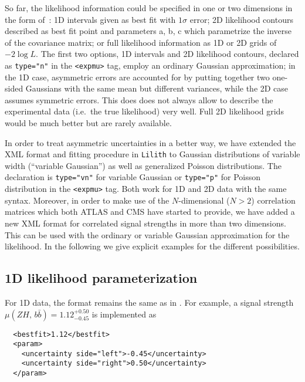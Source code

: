 So far, the likelihood information could be specified in one or two dimensions %
in the form of~\cite{Bernon:2015hsa}:  
1D intervals given as best fit with $1\sigma$ error; 
2D likelihood contours described as best fit point and parameters a, b, c which parametrize the inverse of the covariance matrix; 
or full likelihood information as 1D or 2D grids of $-2\log L$. 
The first two options, 1D intervals and 2D likelihood contours, 
declared as {\tt type="n"} in the  {\tt <expmu>} tag, employ an ordinary Gaussian approximation; 
in the 1D case, asymmetric errors are accounted for by putting together two one-sided Gaussians with the same mean but different variances, 
while the 2D case assumes symmetric errors.   
This does does not always allow to describe the experimental data (i.e.\ the true likelihood) very well. 
Full 2D likelihood grids would be much better but are rarely available. %

In order to treat asymmetric uncertainties in a better way, we have extended the XML format and fitting procedure in {\tt Lilith} to  
Gaussian distributions of variable width (``variable Gaussian'') as well as generalized Poisson distributions. 
The declaration is {\tt type="vn"} for variable Gaussian or {\tt type="p"} for Poisson distribution in the {\tt <expmu>} tag. 
Both work for 1D and 2D data with the same syntax. 
Moreover, in order to make use of the $N$-dimensional ($N>2$) correlation matrices which both ATLAS 
and CMS have started to provide, we have added a new XML format for correlated signal strengths in more than two dimensions. 
This can be used with the ordinary or variable Gaussian approximation for the likelihood. 
In the following we give explicit examples for the different possibilities. 

\clearpage

\subsection*{1D likelihood parameterization}

For 1D data, the format remains the same as in \cite{Bernon:2015hsa}. 
For example, a signal strength $\mu(ZH,\, b\bar b)=1.12^{+0.50}_{-0.45}$ is implemented as

\begin{verbatim}
  <bestfit>1.12</bestfit>
  <param>
    <uncertainty side="left">-0.45</uncertainty>
    <uncertainty side="right">0.50</uncertainty>
  </param>
\end{verbatim}

